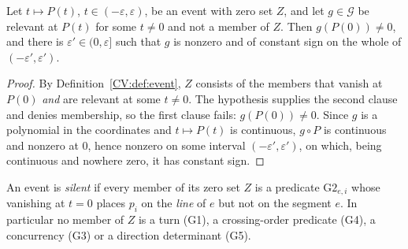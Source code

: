 \begin{lemma}\label{CV:lem:guardconst}\leanok
Let $t\mapsto P(t)$, $t\in(-\varepsilon,\varepsilon)$, be an event with zero set
$Z$, and let $g\in\mathcal G$ be relevant at $P(t)$ for some $t\neq0$ and not a
member of $Z$. Then $g(P(0))\neq0$, and there is
$\varepsilon'\in(0,\varepsilon]$ such that $g$ is nonzero and of constant sign
on the whole of $(-\varepsilon',\varepsilon')$.
\end{lemma}
\begin{proof}\leanok{}
By Definition~\ref{CV:def:event}, $Z$ consists of the members that vanish at
$P(0)$ \emph{and} are relevant at some $t\neq0$. The hypothesis supplies the
second clause and denies membership, so the first clause fails: $g(P(0))\neq0$.
Since $g$ is a polynomial in the coordinates and $t\mapsto P(t)$ is continuous,
$g\circ P$ is continuous and nonzero at $0$, hence nonzero on some interval
$(-\varepsilon',\varepsilon')$, on which, being continuous and nowhere zero, it
has constant sign.
\end{proof}

\begin{definition}\label{CV:def:silent}\leanok
An event is \emph{silent} if every member of its zero set $Z$ is a predicate
$\mathrm{G2}_{e,i}$ whose vanishing at $t=0$ places $p_i$ on the \emph{line} of
$e$ but not on the segment $e$. In particular no member of $Z$ is a turn (G1),
a crossing-order predicate (G4), a concurrency (G3) or a direction determinant
(G5).
\end{definition}

